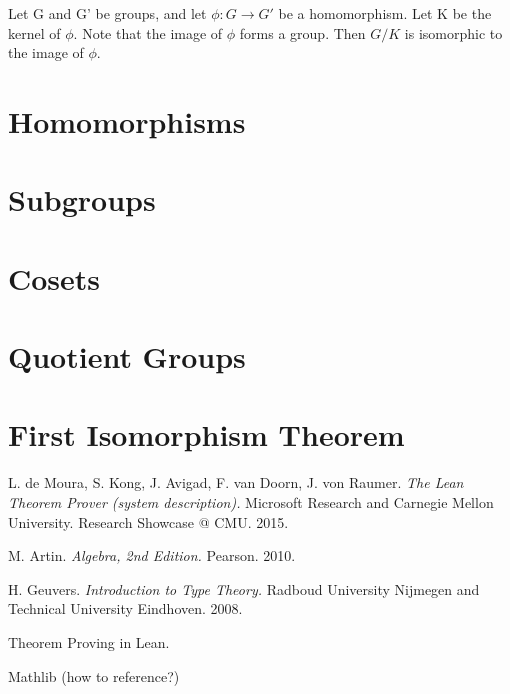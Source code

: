 \documentclass[runningheads,a4paper]{llncs}
\renewcommand{\-}{\setminus}
\begin{document}
\begin{theorem}
Let G and G' be groups, and let $\phi : G \to G'$ be a homomorphism. Let K be the kernel of $\phi$. Note that the image of $\phi$ forms a group. Then $G/K$ is isomorphic to the image of $\phi$.
\end{theorem}


\section{Homomorphisms}

\section{Subgroups}

\section{Cosets}

\section{Quotient Groups}

\section{First Isomorphism Theorem}

\begin{thebibliography}{1}

 L. de Moura, S. Kong, J. Avigad, F. van Doorn, J. von Raumer. {\em The Lean Theorem Prover (system description).} Microsoft Research and Carnegie Mellon University. Research Showcase @ CMU. 2015.

 M. Artin. {\em Algebra, 2nd Edition.} Pearson. 2010.

 H. Geuvers. {\em Introduction to Type Theory.} Radboud University Nijmegen and Technical University Eindhoven. 2008.

 Theorem Proving in Lean.

 Mathlib (how to reference?)

\end{thebibliography}
\end{document}
